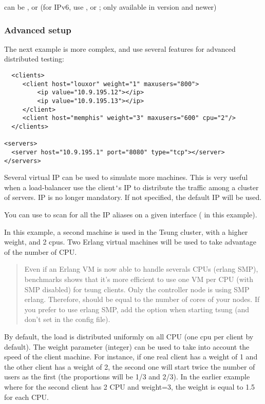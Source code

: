 \documentclass{TSUNG-en}
\begin{document}
 can be ,  or
 (for IPv6, use ,  or
 ; only available in  version  and newer)

\subsubsection{Advanced setup}

The next example is more complex, and use several features for
advanced distributed testing:

\begin{Verbatim}
  <clients>
     <client host="louxor" weight="1" maxusers="800">
         <ip value="10.9.195.12"></ip>
         <ip value="10.9.195.13"></ip>
     </client>
     <client host="memphis" weight="3" maxusers="600" cpu="2"/>
  </clients>

<servers>
  <server host="10.9.195.1" port="8080" type="tcp"></server>
</servers>
 \end{Verbatim}


Several virtual IP can be used to simulate more machines. This is
 very useful when a load-balancer use the client\verb|'|s IP to
 distribute the traffic among a cluster of servers.  IP is no longer mandatory. If not specified, the default IP will
 be used.

 You can use   to scan for all the IP aliases on a given interface
( in this example).

 In this example, a second machine is used in the Tsung cluster,
 with a higher weight, and 2 cpus. Two Erlang virtual machines will be
 used to take advantage of the number of CPU.

 \begin{quote}
  Even if an Erlang VM is now able to handle severals CPUs
 (erlang SMP), benchmarks shows that it's more efficient to use one VM
 per CPU (with SMP disabled) for tsung clients. Only the controller node is using SMP
 erlang. Therefore,  should be equal to the number of cores of
 your nodes. If you prefer to use erlang SMP, add the 
 option when starting tsung (and don't set  in the config
 file).
 \end{quote}

 By default, the load is distributed uniformly on all CPU (one cpu
 per client by default). The weight parameter (integer) can be used to
 take into account the speed of the client machine. For instance, if
 one real client has a weight of 1 and the other client has a weight
 of 2, the second one will start twice the number of users as the
 first (the proportions will be 1/3 and 2/3). In the earlier example
 where for the second client has 2 CPU and weight=3, the weight is
 equal to 1.5 for each CPU.
\end{document}
